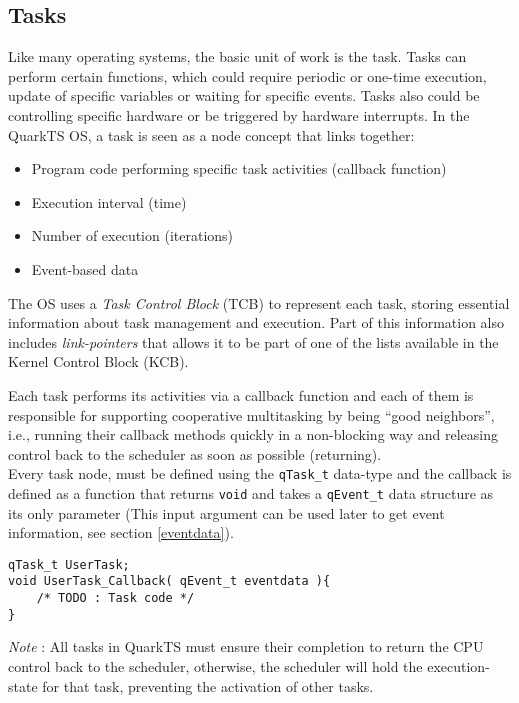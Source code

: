 \subsection{Tasks}
Like many operating systems, the basic unit of work is the task. Tasks can perform certain functions, which could require periodic or one-time execution, update of specific variables or waiting for specific events. Tasks also could be controlling specific hardware or be triggered by hardware interrupts. In the QuarkTS OS, a task is seen as a node concept that links together:

\begin{itemize}
    \item Program code performing specific task activities (callback function)
    \item Execution interval (time)
    \item Number of execution (iterations)
    \item Event-based data
\end{itemize}

The OS  uses a \textit{Task Control Block} (TCB) to represent each task, storing essential information about task management and execution. Part of this information also includes \textit{link-pointers} that allows it to be part of one of the lists available in the Kernel Control Block (KCB).



Each task performs its activities via a callback function and each of them is responsible for supporting cooperative multitasking by being “good neighbors”, i.e., running their callback methods quickly in a non-blocking way and releasing control back to the scheduler as soon as possible (returning). \\

Every task node, must be defined using the \lstinline{qTask_t}  data-type and the callback is defined as a function that returns \lstinline{void} and takes a \lstinline{qEvent_t} data structure as its only parameter (This input argument can be used later to get event information, see section \ref{eventdata}).\\

\begin{lstlisting}[style=CStyle]
qTask_t UserTask;
void UserTask_Callback( qEvent_t eventdata ){
    /* TODO : Task code */
}
\end{lstlisting}

\begin{tcolorbox}
\ArrowBoldDownRight \textit{Note} : All tasks in QuarkTS must ensure their completion to return the CPU control back to the scheduler, otherwise, the scheduler will hold the execution-state for that task, preventing the activation of other tasks.
\end{tcolorbox}


